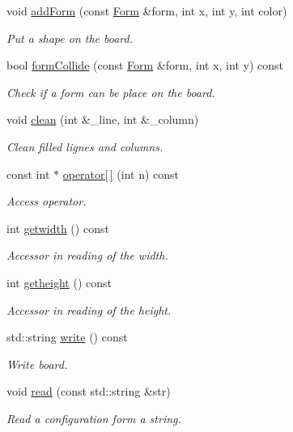 \begin{DoxyCompactItemize}
void \hyperlink{class_board_a533f62eccb7919cd20aba0ae9ea0e790}{add\+Form} (const \hyperlink{class_form}{Form} \&form, int x, int y, int color)
\begin{DoxyCompactList}\small\item\em Put a shape on the board. \end{DoxyCompactList}\item 
bool \hyperlink{class_board_a6daa08c6ef14e1935538a749a6062913}{form\+Collide} (const \hyperlink{class_form}{Form} \&form, int x, int y) const
\begin{DoxyCompactList}\small\item\em Check if a form can be place on the board. \end{DoxyCompactList}\item 
void \hyperlink{class_board_ad4c85c20b50431a292293f38f412436a}{clean} (int \&\+\_\+line, int \&\+\_\+column)
\begin{DoxyCompactList}\small\item\em Clean filled lignes and columns. \end{DoxyCompactList}\item 
const int $\ast$ \hyperlink{class_board_a92d07d150ac4f9c341fd18168d86072c}{operator\mbox{[}$\,$\mbox{]}} (int n) const
\begin{DoxyCompactList}\small\item\em Access operator. \end{DoxyCompactList}\item 
int \hyperlink{class_board_a503f6433c6b70b70d79a775f53a46d77}{getwidth} () const
\begin{DoxyCompactList}\small\item\em Accessor in reading of the width. \end{DoxyCompactList}\item 
int \hyperlink{class_board_aafa14471fcdcd50b0edb336d4454b40c}{getheight} () const
\begin{DoxyCompactList}\small\item\em Accessor in reading of the height. \end{DoxyCompactList}\item 
std\+::string \hyperlink{class_board_a57166342ac5109301eba30a452c515af}{write} () const
\begin{DoxyCompactList}\small\item\em Write board. \end{DoxyCompactList}\item 
void \hyperlink{class_board_a32cb3d0839fd2abceb1ffcba270ae4fd}{read} (const std\+::string \&str)
\begin{DoxyCompactList}\small\item\em Read a configuration form a string. \end{DoxyCompactList}\end{DoxyCompactItemize}


